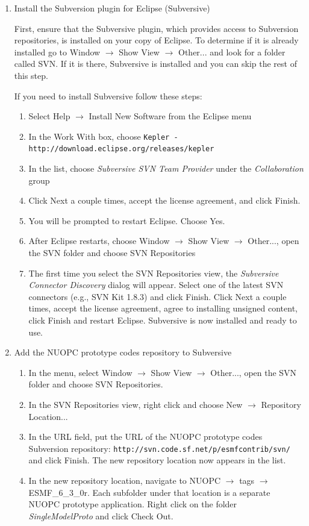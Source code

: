 \documentclass[oneside,11pt]{memoir}
\begin{document}
\begin{enumerate}

\item Install the Subversion plugin for Eclipse (Subversive)

First, ensure that the Subversive plugin, which provides access to Subversion repositories, is installed on your copy of Eclipse.  To determine if it is already installed go to Window $\rightarrow$ Show View $\rightarrow$ Other... and look for a folder called SVN. If it is there, Subversive is installed and you can skip the rest of this step.

If you need to install Subversive follow these steps:
\begin{enumerate}
\item Select Help $\rightarrow$ Install New Software from the Eclipse menu
\item In the Work With box, choose \texttt{Kepler - http://download.eclipse.org/releases/kepler}
\item In the list, choose \emph{Subversive SVN Team Provider} under the \emph{Collaboration} group
\item Click Next a couple times, accept the license agreement, and click Finish.
\item You will be prompted to restart Eclipse.  Choose Yes.
\item After Eclipse restarts, choose Window $\rightarrow$ Show View $\rightarrow$ Other..., open the SVN folder and choose SVN Repositories
\item The first time you select the SVN Repositories view, the \emph{Subversive Connector Discovery} dialog will appear.  Select one of the latest SVN connectors (e.g., SVN Kit 1.8.3) and click Finish.  Click Next a couple times, accept the license agreement, agree to installing unsigned content, click Finish and restart Eclipse.  Subversive is now installed and ready to use.
\end{enumerate}

\item Add the NUOPC prototype codes repository to Subversive
\begin{enumerate}
\item In the menu, select Window $\rightarrow$ Show View $\rightarrow$ Other..., open the SVN folder and choose SVN Repositories.
\item In the SVN Repositories view, right click and choose New $\rightarrow$ Repository Location...
\item In the URL field, put the URL of the NUOPC prototype codes Subversion repository: \texttt{http://svn.code.sf.net/p/esmfcontrib/svn/} and click Finish.  The new repository location now appears in the list.
\item In the new repository location, navigate to NUOPC $\rightarrow$ tags $\rightarrow$ ESMF\_6\_3\_0r.  Each subfolder under that location is a separate NUOPC prototype application. Right click on the folder \emph{SingleModelProto} and click Check Out.


\end{enumerate}
\end{enumerate}
\end{document}
